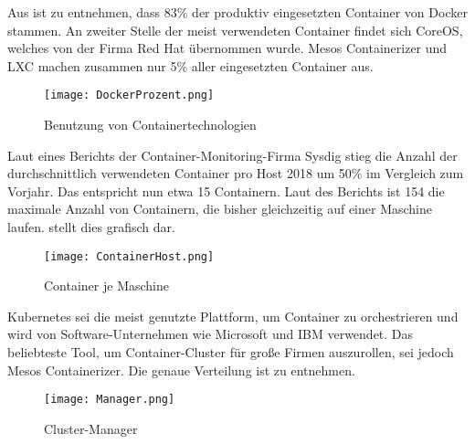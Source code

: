 \newpage
Aus  ist zu entnehmen, dass 83\% der produktiv eingesetzten Container von Docker stammen. An zweiter Stelle der meist verwendeten Container findet sich CoreOS, welches von der Firma Red Hat übernommen wurde. Mesos Containerizer und \ac{LXC} machen zusammen nur 5\% aller eingesetzten Container aus. \citep{stats}
\begin{figure}[H]
	\begin{center}
		\texttt{[image: DockerProzent.png]}
	\end{center}
	\caption[Benutzung von Containertechnologien]{Benutzung von Containertechnologien \footnotemark}
	\label{fig:Stats2}
\end{figure}
Laut eines Berichts der Container-Monitoring-Firma Sysdig stieg die Anzahl der durchschnittlich verwendeten Container pro Host 2018 um 50\% im Vergleich zum Vorjahr. Das entspricht nun etwa 15 Containern. Laut des Berichts ist 154 die maximale Anzahl von Containern, die bisher gleichzeitig auf einer Maschine laufen. \citep{stats}  stellt dies grafisch dar.
\begin{figure}[H]
	\begin{center}
		\texttt{[image: ContainerHost.png]}
	\end{center}
	\caption[Container je Maschine]{Container je Maschine \footnotemark}
	\label{fig:Stats3}
\end{figure}
\newpage
Kubernetes sei die meist genutzte Plattform, um Container zu orchestrieren und wird von Software-Unternehmen wie Microsoft und IBM verwendet. Das beliebteste Tool, um Container-Cluster für große Firmen auszurollen, sei jedoch Mesos Containerizer. \citep{stats} Die genaue Verteilung ist  zu entnehmen.
\begin{figure}[H]
	\begin{center}
		\texttt{[image: Manager.png]}
	\end{center}
	\caption[Cluster-Manager]{Cluster-Manager \footnotemark}
	\label{fig:Stats4}
\end{figure}

